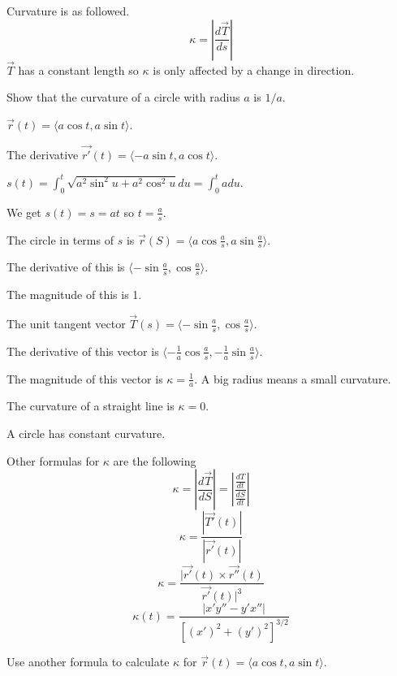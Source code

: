 \documentclass[../calc3.tex]{subfiles}
\begin{document}
Curvature is as followed.
\[ \kappa = \left| \frac{d\vec{T}}{ds}\right| \]
$\vec{T}$ has a constant length so $\kappa$ is only affected by a change in direction.

\begin{example}
    Show that the curvature of a circle with radius $a$ is $1/a$.

    $\vec{r}(t)=\langle a\cos t, a\sin t\rangle$.

    The derivative $\vec{r'}(t)=\langle -a\sin t,a\cos t\rangle$.

    $s(t)=\int_0^t \sqrt{a^2\sin^2 u+a^2\cos^2 u}du =\int_0^t a du$.

    We get $s(t)=s=at$ so $t=\frac{a}{s}$.

    The circle in terms of $s$ is $\vec{r}(S)=\langle a\cos \frac{a}{s},a\sin\frac{a}{s}\rangle$.

    The derivative of this is $\langle -\sin\frac{a}{s},\cos\frac{a}{s}\rangle$.

    The magnitude of this is 1.

    The unit tangent vector $\vec{T}(s)=\langle -\sin \frac{a}{s},\cos\frac{a}{s}\rangle$.

    The derivative of this vector is $\langle -\frac{1}{a}\cos \frac{a}{s}, -\frac{1}{a}\sin\frac{a}{s}\rangle$.

    The magnitude of this vector is $\kappa = \frac{1}{a}$. A big radius means a small curvature.
\end{example}

The curvature of a straight line is $\kappa =0$.

A circle has constant curvature.

Other formulas for $\kappa$ are the following
\[ \kappa = \left| \frac{d\vec{T}}{dS}\right| = \left| \frac{\frac{dT}{dt}}{\frac{dS}{dt}} \right|\]
\[ \kappa = \frac{|\vec{T'}(t)|}{|\vec{r'}(t)|} \]
\[ \kappa = \frac{|\vec{r'}(t)\times \vec{r''}(t)}{\vec{r'}(t)|^3} \]
\[ \kappa(t) = \frac{|x'y''-y'x''|}{[(x')^2+(y')^2]^{3/2}}\]

\ex Use another formula to calculate $\kappa$ for $\vec{r}(t)=\langle a\cos t,a\sin t\rangle$.
\end{document}
